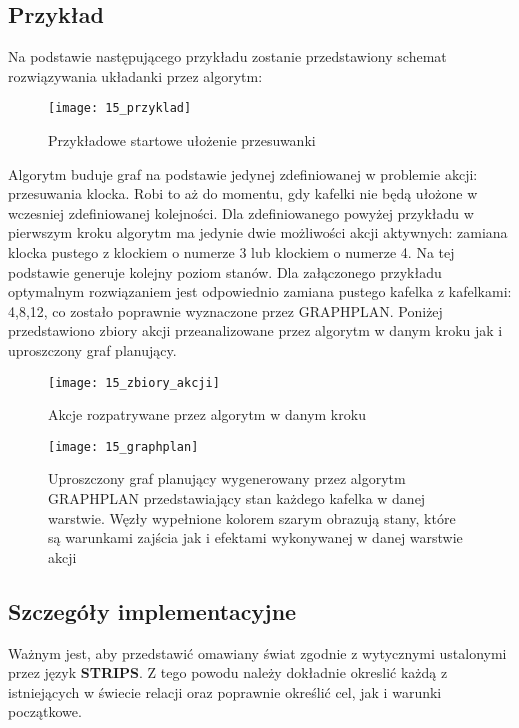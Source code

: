     \subsection{Przykład}
        Na podstawie następującego przykładu zostanie przedstawiony schemat rozwiązywania układanki przez algorytm:
        \begin{figure}[H]
            \texttt{[image: 15\_przyklad]}
            \centering
            \caption{Przykładowe startowe ułożenie przesuwanki}
        \end{figure}
        Algorytm buduje graf na podstawie jedynej zdefiniowanej w problemie akcji: przesuwania klocka. Robi to aż do momentu, gdy kafelki nie 
        będą ułożone w wczesniej zdefiniowanej kolejności. Dla zdefiniowanego powyżej przykładu w pierwszym kroku algorytm ma jedynie dwie możliwości 
        akcji aktywnych: zamiana klocka pustego z klockiem o numerze 3 lub klockiem o numerze 4. Na tej podstawie generuje kolejny poziom stanów. 
        Dla załączonego przykładu optymalnym rozwiązaniem jest odpowiednio zamiana pustego kafelka z kafelkami: 4,8,12, co zostało poprawnie 
        wyznaczone przez GRAPHPLAN. Poniżej przedstawiono zbiory akcji przeanalizowane przez algorytm w danym kroku jak i uproszczony graf planujący.

        \begin{figure}[H]
            \texttt{[image: 15\_zbiory\_akcji]}
            \centering
            \caption{Akcje rozpatrywane przez algorytm w danym kroku}
        \end{figure}

        \begin{figure}[H]
            \texttt{[image: 15\_graphplan]}
            \centering
            \caption{Uproszczony graf planujący wygenerowany przez algorytm GRAPHPLAN przedstawiający stan każdego kafelka w danej warstwie. Węzły wypełnione 
            kolorem szarym obrazują stany, które są warunkami zajścia jak i efektami wykonywanej w danej warstwie akcji}
        \end{figure}





    \subsection{Szczegóły implementacyjne}
    Ważnym jest, aby przedstawić omawiany świat zgodnie z wytycznymi ustalonymi przez język \textbf{STRIPS}. Z tego powodu należy dokładnie okreslić 
    każdą z istniejących w świecie relacji oraz poprawnie określić cel, jak i warunki początkowe.

